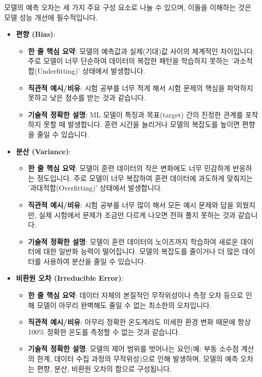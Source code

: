 \documentclass[11pt,a4paper]{article}
\begin{document}
\begin{itemize}
모델의 예측 오차는 세 가지 주요 구성 요소로 나눌 수 있으며, 이들을 이해하는 것은 모델 성능 개선에 필수적입니다.

\begin{itemize}
    \item \textbf{편향 (Bias)}:
    \begin{itemize}
        \item \textbf{한 줄 핵심 요약}: 모델의 예측값과 실제(기대)값 사이의 체계적인 차이입니다. 주로 모델이 너무 단순하여 데이터의 복잡한 패턴을 학습하지 못하는 '과소적합(Underfitting)' 상태에서 발생합니다.
        \item \textbf{직관적 예시/비유}: 시험 공부를 너무 적게 해서 시험 문제의 핵심을 파악하지 못하고 낮은 점수를 받는 것과 같습니다.
        \item \textbf{기술적 정확한 설명}: ML 모델이 특징과 목표(target) 간의 진정한 관계를 포착하지 못할 때 발생합니다. 훈련 시간을 늘리거나 모델의 복잡도를 높이면 편향을 줄일 수 있습니다.
    \end{itemize}

    \item \textbf{분산 (Variance)}:
    \begin{itemize}
        \item \textbf{한 줄 핵심 요약}: 모델이 훈련 데이터의 작은 변화에도 너무 민감하게 반응하는 정도입니다. 주로 모델이 너무 복잡하여 훈련 데이터에 과도하게 맞춰지는 '과대적합(Overfitting)' 상태에서 발생합니다.
        \item \textbf{직관적 예시/비유}: 시험 공부를 너무 많이 해서 모든 예시 문제와 답을 외웠지만, 실제 시험에서 문제가 조금만 다르게 나오면 전혀 풀지 못하는 것과 같습니다.
        \item \textbf{기술적 정확한 설명}: 모델이 훈련 데이터의 노이즈까지 학습하여 새로운 데이터에 대한 일반화 능력이 떨어집니다. 모델의 복잡도를 줄이거나 더 많은 데이터를 사용하여 분산을 줄일 수 있습니다.
    \end{itemize}

    \item \textbf{비환원 오차 (Irreducible Error)}:
    \begin{itemize}
        \item \textbf{한 줄 핵심 요약}: 데이터 자체의 본질적인 무작위성이나 측정 오차 등으로 인해 모델이 아무리 완벽해도 줄일 수 없는 최소한의 오차입니다.
        \item \textbf{직관적 예시/비유}: 아무리 정확한 온도계라도 미세한 환경 변화 때문에 항상 100\% 정확한 온도를 측정할 수 없는 것과 같습니다.
        \item \textbf{기술적 정확한 설명}: 모델의 제어 범위를 벗어나는 요인(예: 부동 소수점 계산의 한계, 데이터 수집 과정의 무작위성)으로 인해 발생하며, 모델의 예측 오차는 편향, 분산, 비환원 오차의 합으로 구성됩니다.
    \end{itemize}


\end{itemize}
\end{itemize}
\end{document}
